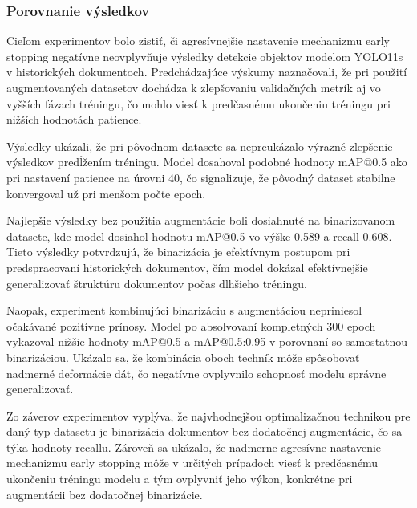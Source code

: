                 \subsubsection{Porovnanie výsledkov}

                Cieľom experimentov bolo zistiť, či agresívnejšie nastavenie mechanizmu early stopping negatívne neovplyvňuje výsledky detekcie objektov modelom YOLO11s v historických dokumentoch. Predchádzajúce výskumy naznačovali, že pri použití augmentovaných datasetov dochádza k zlepšovaniu validačných metrík aj vo vyšších fázach tréningu, čo mohlo viesť k predčasnému ukončeniu tréningu pri nižších hodnotách patience.

                Výsledky ukázali, že pri pôvodnom datasete sa nepreukázalo výrazné zlepšenie výsledkov predĺžením tréningu. Model dosahoval podobné hodnoty mAP@0.5 ako pri nastavení patience na úrovni 40, čo signalizuje, že pôvodný dataset stabilne konvergoval už pri menšom počte epoch.

                Najlepšie výsledky bez použitia augmentácie boli dosiahnuté na binarizovanom datasete, kde model dosiahol hodnotu mAP@0.5 vo výške 0.589 a recall 0.608. Tieto výsledky potvrdzujú, že binarizácia je efektívnym postupom pri predspracovaní historických dokumentov, čím model dokázal efektívnejšie generalizovať štruktúru dokumentov počas dlhšieho tréningu.

                Naopak, experiment kombinujúci binarizáciu s augmentáciou nepriniesol očakávané pozitívne prínosy. Model po absolvovaní kompletných 300 epoch vykazoval nižšie hodnoty mAP@0.5 a mAP@0.5:0.95 v porovnaní so samostatnou binarizáciou. Ukázalo sa, že kombinácia oboch techník môže spôsobovať nadmerné deformácie dát, čo negatívne ovplyvnilo schopnosť modelu správne generalizovať.

                Zo záverov experimentov vyplýva, že najvhodnejšou optimalizačnou technikou pre daný typ datasetu je binarizácia dokumentov bez dodatočnej augmentácie, čo sa týka hodnoty recallu. Zároveň sa ukázalo, že nadmerne agresívne nastavenie mechanizmu early stopping môže v určitých prípadoch viesť k predčasnému ukončeniu tréningu modelu a tým ovplyvniť jeho výkon, konkrétne pri augmentácii bez dodatočnej binarizácie.
                

